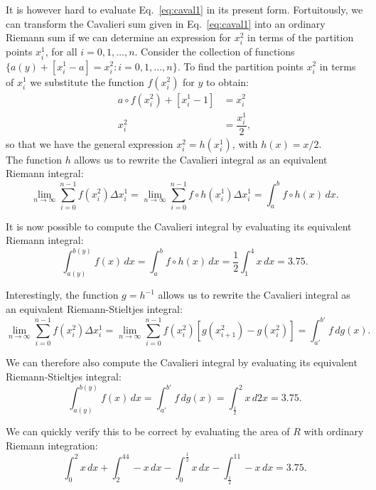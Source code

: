 \documentclass{article}
\theoremstyle{theorem}
\theoremstyle{definition}
\begin{document}
\noindent
It is however hard to evaluate Eq.~\eqref{eq:caval1} in its present form. Fortuitously, we can transform the Cavalieri sum given in Eq.~\eqref{eq:caval1} into an ordinary Riemann sum
if we can determine an expression for $x_i^2$ in terms of the partition points $x_i^1$, for all $i=0,1,\ldots,n$. Consider the collection of functions $\{a(y) + [x_i^1-a] = x_i^2: i=0,1,\ldots,n\}$. To find the partition points $x_i^2$ in terms of $x_i^1$ we substitute the function $f(x_i^2)$ for $y$ to obtain:
\begin{align*}
a\circ f (x_i^2)+[x_i^1-1] &= x_i^2\\
x_i^2 &= \dfrac{x_i^1}{2},
\end{align*}
so that we have the general expression $x_i^2=h(x_i^1)$, with $h(x)=x/2$.\\

\noindent
The function $h$ allows us to rewrite the Cavalieri integral as an equivalent Riemann integral:
\begin{equation}
\label{eq:h_int}
\lim_{n\to \infty}\sum_{i=0}^{n-1} f(x_i^2)\Delta x_i^1 =  \lim_{n\to \infty}\sum_{i=0}^{n-1} f \circ h (x_i^1)\Delta x_i^1 = \int_a^b f \circ h (x)\, dx.
\end{equation}

\noindent
It is now possible to compute the Cavalieri integral by evaluating its equivalent Riemann integral:
\begin{equation}
\int_{a(y)}^{b(y)}f(x)\, dx = \int_a^b f \circ h (x)\, dx = \dfrac{1}{2}\int_1^4x\, dx = 3.75.  
\end{equation}

\noindent
Interestingly, the function $g=h^{-1}$ allows us to rewrite the Cavalieri integral as an equivalent Riemann-Stieltjes integral:
\begin{equation}
\label{eq:g_int}
\lim_{n\to \infty}\sum_{i=0}^{n-1} f(x_i^2)\Delta x_i^1 =  \lim_{n\to \infty} \sum_{i=0}^{n-1} f(x_i^2)[g(x_{i+1}^2)-g(x_{i}^2)] = \int_{a'}^{b'} f \, dg(x). 
\end{equation}

\noindent
We can therefore also compute the Cavalieri integral by evaluating its equivalent Riemann-Stieltjes integral:
\begin{equation}
\int_{a(y)}^{b(y)}f(x)\, dx = \int_{a'}^{b'} f \, dg(x) = \int_{\frac{1}{2}}^2x\, d2x = 3.75.  
\end{equation}

\noindent
We can quickly verify this to be correct by evaluating the area of $R$ with ordinary Riemann integration:
\begin{equation}
\int_0^2x\, dx+\int_2^44-x\, dx- \int_0^{\frac{1}{2}}x\, dx-\int_{\frac{1}{2}}^11-x\, dx = 3.75. 
\end{equation}
\end{document}
